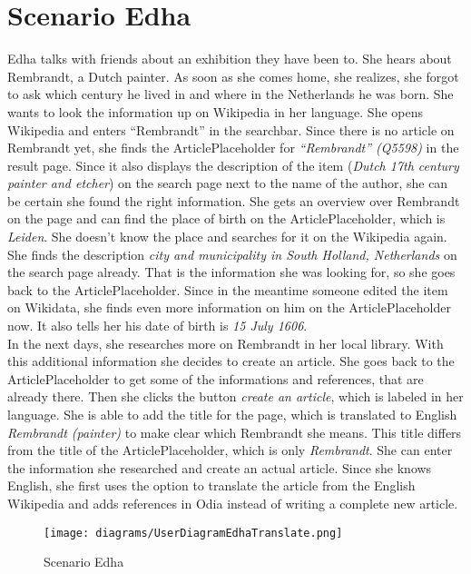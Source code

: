 \section{Scenario Edha} 
Edha talks with friends about an exhibition they have been to. She hears about Rembrandt, a Dutch painter. As soon as she comes home, she realizes, she forgot to ask which century he lived in and where in the Netherlands he was born. She wants to look the information up on Wikipedia in her language. She opens Wikipedia and enters ``Rembrandt'' in the searchbar. Since there is no article on Rembrandt yet, she finds the ArticlePlaceholder for \textit{``Rembrandt'' (Q5598)} \citep{wd:01} in the result page. Since it also displays the description of the item (\textit{Dutch 17th century painter and etcher})  on the search page next to the name of the author, she can be certain she found the right information. She gets an overview over Rembrandt on the page and can find the place of birth on the ArticlePlaceholder, which is \textit{Leiden}. She doesn't know the place and searches for it on the Wikipedia again. She finds the description \textit{city and municipality in South Holland, Netherlands} \citep{wd:02} on the search page already. That is the information she was looking for, so she goes back to the ArticlePlaceholder. Since in the meantime someone edited the item on Wikidata, she finds even more information on him on the ArticlePlaceholder now. It also tells her his date of birth is \textit{15 July 1606}. \\
In the next days, she researches more on Rembrandt in her local library. With this additional information she decides to create an article. She goes back to the ArticlePlaceholder to get some of the informations and references, that are already there. Then she clicks the button \textit{create an article}, which is labeled in her language. She is able to add the title for the page, which is translated to English \textit{Rembrandt (painter)} to make clear which Rembrandt she means. This title differs from the title of the ArticlePlaceholder, which is only \textit{Rembrandt}. She can enter the information she researched and create an actual article. Since she knows English, she first uses the option to translate the article from the English Wikipedia and adds references in Odia instead of writing a complete new article.
\begin{figure}[H]
	\centering
	\texttt{[image: diagrams/UserDiagramEdhaTranslate.png]}
	\caption{Scenario Edha}
	\label{fig:ScenarioEdha}
\end{figure}

